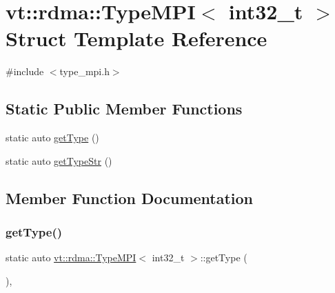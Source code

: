 \hypertarget{structvt_1_1rdma_1_1_type_m_p_i_3_01int32__t_01_4}{}\section{vt\+:\+:rdma\+:\+:Type\+M\+PI$<$ int32\+\_\+t $>$ Struct Template Reference}
\label{structvt_1_1rdma_1_1_type_m_p_i_3_01int32__t_01_4}


{\ttfamily \#include $<$type\+\_\+mpi.\+h$>$}

\subsection*{Static Public Member Functions}
\begin{DoxyCompactItemize}
\item 
static auto \hyperlink{structvt_1_1rdma_1_1_type_m_p_i_3_01int32__t_01_4_a9487e01cb3bf72d43af52eaddc0fd9a6}{get\+Type} ()
\item 
static auto \hyperlink{structvt_1_1rdma_1_1_type_m_p_i_3_01int32__t_01_4_a67cdb3e2420567c925df06b90ed4760e}{get\+Type\+Str} ()
\end{DoxyCompactItemize}


\subsection{Member Function Documentation}
\mbox{\label{structvt_1_1rdma_1_1_type_m_p_i_3_01int32__t_01_4_a9487e01cb3bf72d43af52eaddc0fd9a6}} 
\subsubsection{\texorpdfstring{get\+Type()}{getType()}}
{\footnotesize\ttfamily static auto \hyperlink{structvt_1_1rdma_1_1_type_m_p_i}{vt\+::rdma\+::\+Type\+M\+PI}$<$ int32\+\_\+t $>$\+::get\+Type (\begin{DoxyParamCaption}{ }\end{DoxyParamCaption})\hspace{0.3cm}{\ttfamily [inline]}, {\ttfamily [static]}}

